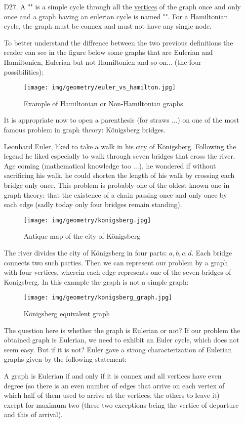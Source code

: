 {\begin{enumerate}
	\item[D27.] A "\label{hamiltonian cycle}" is a simple cycle through all the \underline{vertices} of the graph once and only once and a graph having an eulerian cycle is named "". For a Hamiltonian cycle, the graph must be connex and must not have any single node.
	
	To better understand the diffrence between the two previous definitions the reader can see in the figure below some graphs that are Eulerian and Hamiltonien, Eulerian but not Hamiltonien and so on... (the four possibilities):
	\begin{figure}[H]
		\centering
		\texttt{[image: img/geometry/euler\_vs\_hamilton.jpg]}
		\caption{Example of Hamiltonian or Non-Hamiltonian graphs}
	\end{figure}
	It is appropriate now to open a parenthesis (for straws ...) on one of the most famous problem in graph theory: Königsberg bridges.
	
	Leonhard Euler, liked to take a walk in his city of Königsberg. Following the legend he liked especially to walk through seven bridges that cross the river. Age coming (mathematical knowledge too ...), he wondered if without sacrificing his walk, he could shorten the length of his walk by crossing each bridge only once. This problem is probably one of the oldest known one in graph theory: that the existence of a chain passing once and only once by each edge (sadly today only four bridges remain standing).
	\begin{figure}[H]
		\centering
		\texttt{[image: img/geometry/konigsberg.jpg]}
		\caption{Antique map of the city of Königsberg}
	\end{figure}
	The river divides the city of Königsberg in four parts: $a, b, c, d$. Each bridge connects two such parties. Then we can represent our problem by a graph with four vertices, wherein each edge represents one of the seven bridges of Konigsberg. In this example the graph is not a simple graph:
	\begin{figure}[H]
		\centering
		\texttt{[image: img/geometry/konigsberg\_graph.jpg]}
		\caption{Königsberg equivalent graph}
	\end{figure}
	The question here is whether the graph is Eulerian or not? If our problem the obtained graph is Eulerian, we need to exhibit an Euler cycle, which does not seem easy. But if it is not? Euler gave a strong characterization of Eulerian graphs given by the following statement:
	\begin{theorem}
	A graph is Eulerian if and only if it is connex and all vertices have even degree (so there is an even number of edges that arrive on each vertex of which half of them used to arrive at the vertices, the others to leave it) except for maximum two (these two exceptions being the vertice of departure and this of arrival).
	

\end{theorem}
\end{enumerate}}

